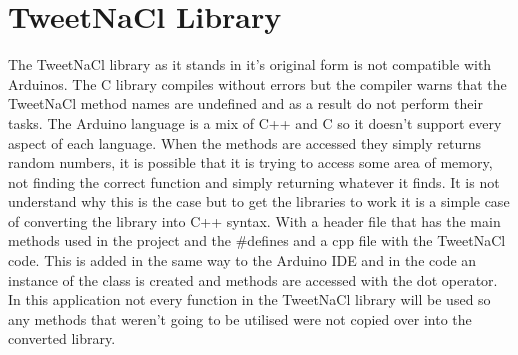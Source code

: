 \section{TweetNaCl Library}

The TweetNaCl library as it stands in it's original form is not compatible with Arduinos. The C library compiles without errors but the compiler warns that the TweetNaCl method names are undefined and as a result do not perform their tasks. The Arduino language is a mix of C++ and C so it doesn't support every aspect of each language. When the methods are accessed they simply returns random numbers, it is possible that it is trying to access some area of memory, not finding the correct function and simply returning whatever it finds. It is not understand why this is the case but to get the libraries to work it is a simple case of converting the library into C++ syntax. With a header file that has the main methods used in the project and the \#defines and a cpp file with the TweetNaCl code. This is added in the same way to the Arduino IDE and in the code an instance of the class is created and methods are accessed with the dot operator. In this application not every function in the TweetNaCl library will be used so any methods that weren't going to be utilised were not copied over into the converted library.



